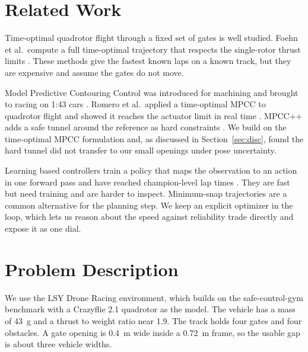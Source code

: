 \documentclass[conference]{IEEEtran}
\begin{document}
\section{Related Work}
\label{sec:related}
Time-optimal quadrotor flight through a fixed set of gates is well studied. Foehn et al.\ compute a full time-optimal trajectory that respects the single-rotor thrust limits \cite{foehn}. These methods give the fastest known laps on a known track, but they are expensive and assume the gates do not move.

Model Predictive Contouring Control was introduced for machining \cite{lam} and brought to racing on 1:43 cars \cite{liniger}. Romero et al.\ applied a time-optimal MPCC to quadrotor flight and showed it reaches the actuator limit in real time \cite{mpcc}. MPCC++ adds a safe tunnel around the reference as hard constraints \cite{mpccpp}. We build on the time-optimal MPCC formulation and, as discussed in Section~\ref{sec:disc}, found the hard tunnel did not transfer to our small openings under pose uncertainty.

Learning based controllers train a policy that maps the observation to an action in one forward pass and have reached champion-level lap times \cite{champion,songrl}. They are fast but need training and are harder to inspect. Minimum-snap trajectories \cite{minsnap} are a common alternative for the planning step. We keep an explicit optimizer in the loop, which lets us reason about the speed against reliability trade directly and expose it as one dial.

\section{Problem Description}
\label{sec:problem}
We use the LSY Drone Racing environment, which builds on the safe-control-gym benchmark \cite{scg} with a Crazyflie 2.1 quadrotor \cite{crazyflie} as the model. The vehicle has a mass of 43~g and a thrust to weight ratio near 1.9. The track holds four gates and four obstacles. A gate opening is 0.4~m wide inside a 0.72~m frame, so the usable gap is about three vehicle widths.
\end{document}
